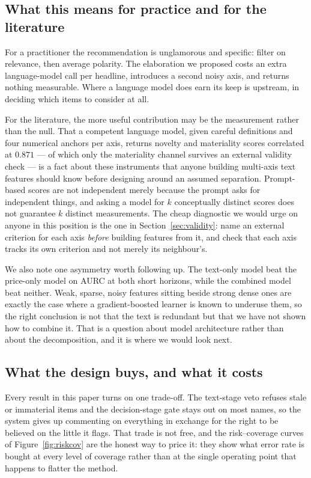 \subsection{What this means for practice and for the literature}

For a practitioner the recommendation is unglamorous and specific: filter on
relevance, then average polarity. The elaboration we proposed costs an extra
language-model call per headline, introduces a second noisy axis, and returns
nothing measurable. Where a language model does earn its keep is upstream, in
deciding which items to consider at all.

For the literature, the more useful contribution may be the measurement rather
than the null. That a competent language model, given careful definitions and four
numerical anchors per axis, returns novelty and materiality scores correlated at
$0.871$ --- of which only the materiality channel survives an external validity
check --- is a fact about these instruments that anyone building multi-axis text
features should know before designing around an assumed separation. Prompt-based
scores are not independent merely because the prompt asks for independent things,
and asking a model for $k$ conceptually distinct scores does not guarantee $k$
distinct measurements. The cheap diagnostic we would urge on anyone in this
position is the one in Section~\ref{sec:validity}: name an external criterion for
each axis \emph{before} building features from it, and check that each axis tracks
its own criterion and not merely its neighbour's.

We also note one asymmetry worth following up. The text-only model beat the
price-only model on AURC at both short horizons, while the combined model beat
neither. Weak, sparse, noisy features sitting beside strong dense ones are exactly
the case where a gradient-boosted learner is known to underuse them, so the right
conclusion is not that the text is redundant but that we have not shown how to
combine it. That is a question about model architecture rather than about the
decomposition, and it is where we would look next.

\subsection{What the design buys, and what it costs}

Every result in this paper turns on one trade-off. The text-stage veto refuses
stale or immaterial items and the decision-stage gate stays out on most names, so
the system gives up commenting on everything in exchange for the right to be
believed on the little it flags. That trade is not free, and the risk--coverage
curves of Figure~\ref{fig:riskcov} are the honest way to price it: they show what
error rate is bought at every level of coverage rather than at the single
operating point that happens to flatter the method.

